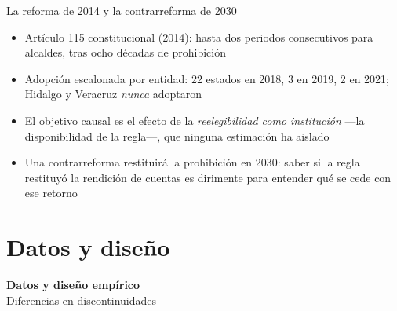 \documentclass[
  aspectratio=43,        %
  t,                     %
  10pt                   %
]{beamer}
\begin{document}
\begin{frame}{La reforma de 2014 y la contrarreforma de 2030}

  \begin{itemize}
    \item Artículo 115 constitucional (2014): hasta dos periodos consecutivos
          para alcaldes, tras \textcolor{ITAMgreen}{ocho décadas} de prohibición
    \item \textcolor{ITAMgreen}{Adopción escalonada} por entidad: 22 estados en
          2018, 3 en 2019, 2 en 2021; Hidalgo y Veracruz \emph{nunca} adoptaron
    \item El objetivo causal es el efecto de la \emph{reelegibilidad como
          institución} —la disponibilidad de la regla—, que ninguna estimación
          ha aislado
    \item Una \textcolor{ITAMmaroon}{contrarreforma} restituirá la prohibición
          en 2030: saber si la regla restituyó la rendición de cuentas es
          dirimente para entender qué se cede con ese retorno
  \end{itemize}

\end{frame}

\section{Datos y diseño}
{
\begin{frame}
  \vfill
  \begin{center}
    \textcolor{ITAMgreen}{\Large\bfseries Datos y diseño empírico}\\[0.5em]
    \textcolor{ITAMgray}{\normalsize Diferencias en discontinuidades}
  \end{center}
  \vfill
\end{frame}
}
\end{document}
